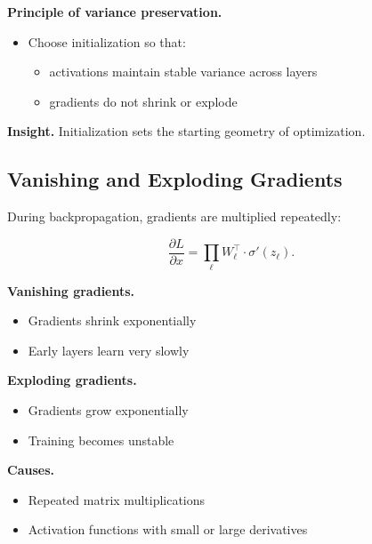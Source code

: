 \medskip

\noindent
\textbf{Principle of variance preservation.}

\begin{itemize}
    \item Choose initialization so that:
    \begin{itemize}
        \item activations maintain stable variance across layers
        \item gradients do not shrink or explode
    \end{itemize}
\end{itemize}

\medskip

\noindent
\textbf{Insight.}  
Initialization sets the starting geometry of optimization.

\subsection{Vanishing and Exploding Gradients}

During backpropagation, gradients are multiplied repeatedly:

\[
\frac{\partial L}{\partial x} =
\prod_{\ell} W_\ell^\top \cdot \sigma'(z_\ell).
\]

\medskip

\noindent
\textbf{Vanishing gradients.}
\begin{itemize}
    \item Gradients shrink exponentially
    \item Early layers learn very slowly
\end{itemize}

\medskip

\noindent
\textbf{Exploding gradients.}
\begin{itemize}
    \item Gradients grow exponentially
    \item Training becomes unstable
\end{itemize}

\medskip

\noindent
\textbf{Causes.}
\begin{itemize}
    \item Repeated matrix multiplications
    \item Activation functions with small or large derivatives
\end{itemize}

\medskip

